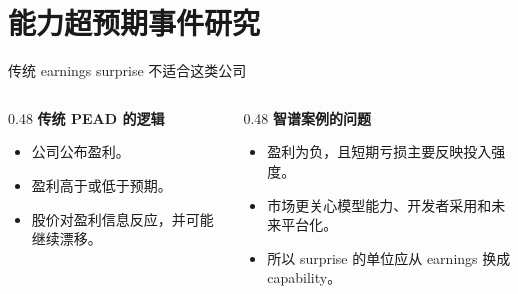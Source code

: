 \documentclass[aspectratio=169,11pt]{beamer}
\begin{document}
\section{能力超预期事件研究}

\begin{frame}{传统 earnings surprise 不适合这类公司}
  \begin{columns}[T,onlytextwidth]
    \begin{column}{0.48\textwidth}
      \textbf{传统 PEAD 的逻辑}
      \begin{itemize}
        \item 公司公布盈利。
        \item 盈利高于或低于预期。
        \item 股价对盈利信息反应，并可能继续漂移。
      \end{itemize}
    \end{column}
    \begin{column}{0.48\textwidth}
      \textbf{智谱案例的问题}
      \begin{itemize}
        \item 盈利为负，且短期亏损主要反映投入强度。
        \item 市场更关心模型能力、开发者采用和未来平台化。
        \item 所以 surprise 的单位应从 earnings 换成 capability。
      \end{itemize}
    \end{column}
  \end{columns}
\end{frame}
\end{document}
